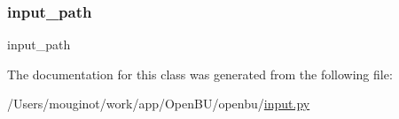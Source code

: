\mbox{\label{classopenbu_1_1input_1_1_input_a97ba302d16021f80ef5f4b6bbc734a74}} 
\subsubsection{\texorpdfstring{input\+\_\+path}{input\_path}}
{\footnotesize\ttfamily input\+\_\+path}



The documentation for this class was generated from the following file\+:\begin{DoxyCompactItemize}
\item 
/\+Users/mouginot/work/app/\+Open\+B\+U/openbu/\mbox{\hyperlink{input_8py}{input.\+py}}\end{DoxyCompactItemize}
